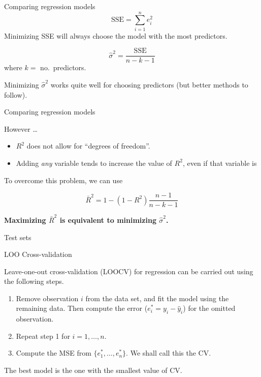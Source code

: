 \documentclass[14pt]{beamer}
\makeatletter
\def\ben{\begin{enumerate}[<+-| alert@+>]}
\def\een{\end{enumerate}}
\makeatother
\begin{document}
\begin{frame}{Comparing regression models}
\[\text{SSE} = \sum_{i=1}^n e_i^2 \]
Minimizing SSE will always choose the model with the most predictors.

\pause
{}
\[
\hat{\sigma}^2 = \frac{\text{SSE}}{n-k-1}
\]
where $k=$ no.\ predictors.\pause

Minimizing $\hat{\sigma}^2$ works quite well for choosing predictors (but better methods to follow).

\end{frame}


\begin{frame}{Comparing regression models}

However \dots
\begin{itemize}
\item $R^2$  does not allow for ``degrees of freedom''.

\item Adding \textit{any} variable tends to increase the value of $R^2$, even if that variable is
\end{itemize}\pause

To overcome   this problem, we can use 
\begin{block}{}
\[
\bar{R}^2 = 1-(1-R^2)\frac{n-1}{n-k-1}
\]
\end{block}
\pause

\centerline{\textcolor[rgb]{0.8,0.00,0.00}{\textbf{Maximizing $\bar{R}^2$ is equivalent to minimizing $\hat\sigma^2$.}}}

\end{frame}


\begin{frame}{Test sets}

\end{frame}

\begin{frame}{LOO Cross-validation}

Leave-one-out cross-validation (LOOCV) for regression can be carried out using the following steps.
\ben
\item Remove observation $i$ from the data set, and fit the model using the remaining data. Then compute the error ($e_i^*=y_i-\hat{y}_i$) for the omitted observation.
\item Repeat step 1 for $i=1,\dots,n$.
\item Compute the MSE from $\{e_1^*,\dots,e_n^*\}$. We shall call this the CV.
\een\pause
The best model is the one with the smallest value of CV.
\end{frame}
\end{document}

